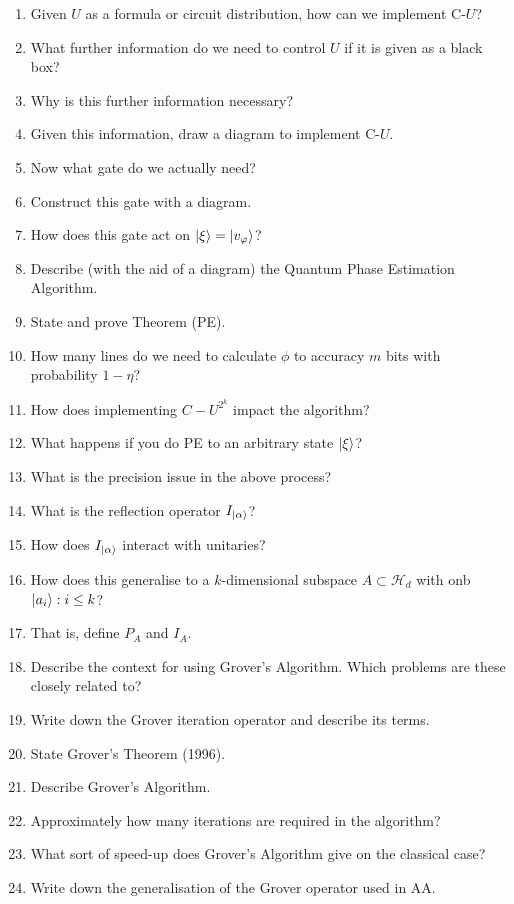 \documentclass[]{article}
\begin{document}
\begin{enumerate}
    \item Given $U$ as a formula or circuit distribution, how can we implement C-$U$?
    \item What further information do we need to control $U$ if it is given as a black box?
    \item Why is this further information necessary?
    \item Given this information, draw a diagram to implement C-$U$.
    \item Now what gate do we actually need?
    \item Construct this gate with a diagram.
    \item How does this gate act on $\lvert\xi\rangle = \lvert v_\varphi\rangle$?
    \item Describe (with the aid of a diagram) the Quantum Phase Estimation Algorithm.
    \item State and prove Theorem (PE).
    \item How many lines do we need to calculate $\phi$ to accuracy $m$ bits with probability $1-\eta$?
    \item How does implementing $C-U^{2^k}$ impact the algorithm?
    \item What happens if you do PE to an arbitrary state $\lvert\xi\rangle$?
    \item What is the precision issue in the above process?
    \item What is the reflection operator $I_{\lvert\alpha\rangle}$?
    \item How does $I_{\lvert\alpha\rangle}$ interact with unitaries?
    \item How does this generalise to a $k$-dimensional subspace $A\subset \mathcal{H}_d$ with onb $\lvert a_i\rangle:i\le k$?
    \item That is, define $P_A$ and $I_A$.
    \item Describe the context for using Grover's Algorithm. Which problems are these closely related to?
    \item Write down the Grover iteration operator and describe its terms.
    \item State Grover's Theorem (1996).
    \item Describe Grover's Algorithm.
    \item Approximately how many iterations are required in the algorithm?
    \item What sort of speed-up does Grover's Algorithm give on the classical case?
    \item Write down the generalisation of the Grover operator used in AA.

\end{enumerate}
\end{document}
